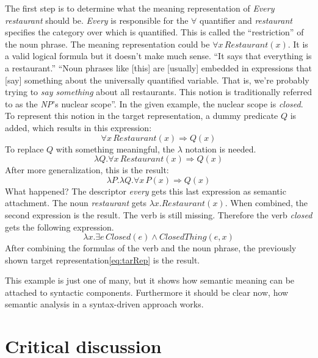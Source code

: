 \documentclass[12pt,twoside]{scrartcl}
\theoremstyle{plain}
\theoremstyle{definition}
\theoremstyle{remark}
\begin{document}
		The first step is to determine what the meaning representation of \textit{Every restaurant} should be. \textit{Every} is responsible for the $\forall$ quantifier and \textit{restaurant} specifies the category over which is quantified. This is called the ``restriction''\cite[p.~622]{Jurafsky2009} of the noun phrase. The meaning representation could be $\forall x\,Restaurant(x)$. It is a valid logical formula but it doesn't make much sense. ``It says that everything is a restaurant.''\cite[p.~622]{Jurafsky2009} ``Noun phrases like [this] are [usually] embedded in expressions that [say] something about the universally quantified variable. That is, we're probably trying to \textit{say something} about all restaurants. This notion is traditionally referred to as the \textit{NP}'s nuclear scope''\cite[p.~622]{Jurafsky2009}. In the given example, the nuclear scope is \textit{closed}. To represent this notion in the target representation, a dummy predicate $Q$ is added, which results in this expression:
		\[
			\forall x\,Restaurant(x) \Rightarrow Q(x)
		\]
		To replace $Q$ with something meaningful, the $\lambda$ notation is needed.
		\[
			\lambda Q.\forall x\,Restaurant(x) \Rightarrow Q(x)
		\] 
		After more generalization, this is the result:
		\[
			\lambda P.\lambda Q.\forall x\,P(x) \Rightarrow Q(x)
		\]
		What happened? The descriptor \textit{every} gets this last expression as semantic attachment. The noun \textit{restaurant} gets $\lambda x.Restaurant(x)$. When combined, the second expression is the result. The verb is still missing. Therefore the verb \textit{closed} gets the following expression.
		\[
			\lambda x.\exists e\,Closed(e) \wedge ClosedThing(e,x)
		\]
		After combining the formulas of the verb and the noun phrase, the previously shown target representation\eqref{eq:tarRep} is the result.
		
		This example is just one of many, but it shows how semantic meaning can be attached to syntactic components. Furthermore it should be clear now, how semantic analysis in a syntax-driven approach works.
\section{Critical discussion}
\label{sec:critDiscussion}

\end{document}
